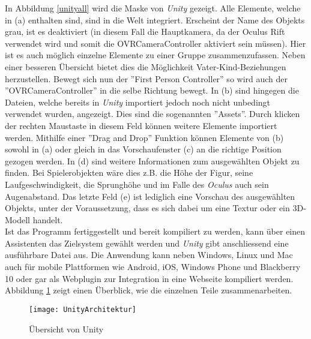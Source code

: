  In Abbildung \ref{unityall} wird die Maske von \textit{Unity} gezeigt. Alle Elemente, welche in (a) enthalten sind, sind in die Welt integriert. Erscheint der Name des Objekts grau, ist es deaktiviert (in diesem Fall die Hauptkamera, da der Oculus Rift verwendet wird und somit die OVRCameraController aktiviert sein müssen). Hier ist es auch möglich einzelne Elemente zu einer Gruppe zusammenzufassen. Neben einer besseren Übersicht bietet dies die Möglichkeit Vater-Kind-Beziehungen herzustellen. Bewegt sich nun der ''First Person Controller'' so wird auch der ''OVRCameraController'' in die selbe Richtung bewegt. In (b) sind hingegen die Dateien, welche bereits in \textit{Unity} importiert jedoch noch nicht unbedingt verwendet wurden, angezeigt. Dies sind die sogenannten ''Assets''. Durch klicken der rechten Maustaste in diesem Feld können weitere Elemente importiert werden. Mithilfe einer ''Drag and Drop'' Funktion können Elemente von (b) sowohl in (a) oder gleich in das Vorschaufenster (c) an die richtige Position gezogen werden. In (d) sind weitere Informationen zum ausgewählten Objekt zu finden. Bei Spielerobjekten wäre dies z.B. die Höhe der Figur, seine Laufgeschwindigkeit, die Sprunghöhe und im Falle des \textit{Oculus} auch sein Augenabstand. Das letzte Feld (e) ist lediglich eine Vorschau des ausgewählten Objekts, unter der Voraussetzung, dass es sich dabei um eine Textur oder ein 3D-Modell handelt.\\[6pt]
 Ist das Programm fertiggestellt und bereit kompiliert zu werden, kann über einen Assistenten das Zielsystem gewählt werden und \textit{Unity} gibt anschliessend eine ausführbare Datei aus. Die Anwendung kann neben Windows, Linux und Mac auch für mobile Plattformen wie Android, iOS, Windows Phone und Blackberry 10 oder gar als Webplugin zur Integration in eine Webseite kompiliert werden. Abbildung \ref{UnityArchitektur} zeigt einen Überblick, wie die einzelnen Teile zusammenarbeiten.\\[6pt]
 \newpage
 

 \begin{figure}[ht]
 	\vspace{-15pt}
 	\begin{center}
 		\texttt{[image: UnityArchitektur]}
 	\end{center}
 	\vspace{-15pt}
 	\caption[Unity Architektur]{Übersicht von Unity}\label{UnityArchitektur}
 	\vspace{-12pt}
 \end{figure} 
 

